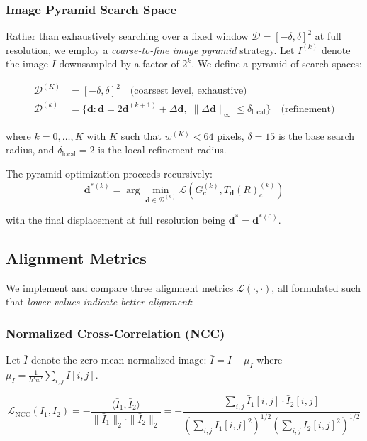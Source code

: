 \documentclass[11pt]{article}
\begin{document}
\subsubsection{Image Pyramid Search Space}

Rather than exhaustively searching over a fixed window $\mathcal{D} = [-\delta, \delta]^2$ at full resolution, we employ a \emph{coarse-to-fine image pyramid} strategy. Let $I^{(k)}$ denote the image $I$ downsampled by a factor of $2^k$. We define a pyramid of search spaces:

\begin{align}
\mathcal{D}^{(K)} &= [-\delta, \delta]^2 \quad \text{(coarsest level, exhaustive)} \\
\mathcal{D}^{(k)} &= \{\mathbf{d} : \mathbf{d} = 2\mathbf{d}^{(k+1)} + \Delta\mathbf{d}, \; \|\Delta\mathbf{d}\|_\infty \leq \delta_{\text{local}}\} \quad \text{(refinement)}
\end{align}

where $k = 0, \ldots, K$ with $K$ such that $w^{(K)} < 64$ pixels, $\delta = 15$ is the base search radius, and $\delta_{\text{local}} = 2$ is the local refinement radius.

The pyramid optimization proceeds recursively:
\begin{equation}
\mathbf{d}^{*(k)} = \arg\min_{\mathbf{d} \in \mathcal{D}^{(k)}} \mathcal{L}(G_c^{(k)}, T_{\mathbf{d}}(R)_c^{(k)})
\end{equation}

with the final displacement at full resolution being $\mathbf{d}^* = \mathbf{d}^{*(0)}$.

\subsection{Alignment Metrics}

We implement and compare three alignment metrics $\mathcal{L}(\cdot, \cdot)$, all formulated such that \emph{lower values indicate better alignment}:

\subsubsection{Normalized Cross-Correlation (NCC)}

Let $\bar{I}$ denote the zero-mean normalized image: $\bar{I} = I - \mu_I$ where $\mu_I = \frac{1}{h'w'}\sum_{i,j} I[i,j]$.

\begin{equation}
\mathcal{L}_{\text{NCC}}(I_1, I_2) = -\frac{\langle \bar{I}_1, \bar{I}_2 \rangle}{\|\bar{I}_1\|_2 \cdot \|\bar{I}_2\|_2} = -\frac{\sum_{i,j} \bar{I}_1[i,j] \cdot \bar{I}_2[i,j]}{\left(\sum_{i,j} \bar{I}_1[i,j]^2\right)^{1/2} \left(\sum_{i,j} \bar{I}_2[i,j]^2\right)^{1/2}}
\end{equation}
\end{document}
